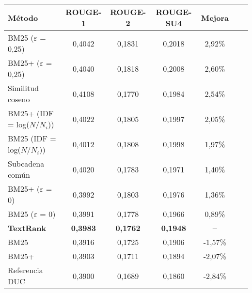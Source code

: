 \documentclass[12pt]{standalone}
\begin{document}
   \begin{varwidth}{75in}
        \begin{table}
        \begin{center}
        \begin{tabular}{l*{5}{c}r}
        \hline
        \rule{0pt}{12pt}
        Método & ROUGE-1 & ROUGE-2 & ROUGE-SU4 & Mejora \\[2pt]
        \hline\rule{0pt}{12pt}\mbox{}\par\nobreak
        BM25 ($\varepsilon$ = 0,25) & 0,4042 & 0,1831 & 0,2018 & 2,92\% \\
        BM25+ ($\varepsilon$ = 0,25) & 0,4040 & 0,1818 & 0,2008 & 2,60\% \\
        Similitud coseno & 0,4108 & 0,1770 & 0,1984 & 2,54\% \\
        BM25+ (IDF = log($N$/$N_i$)) & 0,4022 & 0,1805 & 0,1997 & 2,05\% \\ 
        BM25 (IDF = log($N$/$N_i$)) & 0,4012 & 0,1808 & 0,1998 & 1,97\% \\ 
        Subcadena común & 0,4020 & 0,1783 & 0,1971 & 1,40\% \\
        BM25+ ($\varepsilon$ = 0) & 0,3992 & 0,1803 & 0,1976 & 1,36\% \\ 
        BM25 ($\varepsilon$ = 0) & 0,3991 & 0,1778 & 0,1966 & 0,89\% \\
        \textbf{TextRank} & \textbf{0,3983} & \textbf{0,1762} & \textbf{0,1948} & \textbf{--}\\
        BM25 & 0,3916 & 0,1725 & 0,1906 & -1,57\% \\
        BM25+ & 0,3903 & 0,1711 & 0,1894 & -2,07\% \\
        Referencia DUC & 0,3900 & 0,1689 & 0,1860 & -2,84\% \\ [2pt]
        \hline
        \end{tabular}
        \end{center}
        \end{table}
    \end{varwidth}
\end{document}

